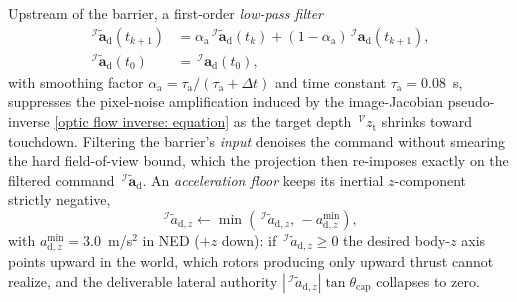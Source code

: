 \documentclass{IEEEtaes}
\begin{document}
Upstream of the barrier, a first-order \emph{low-pass filter}
\begin{align} \label{lpf: equation}
    \,^\mathcal{I}\!\tilde{\boldsymbol{a}}_\text{d}(t_{k+1}) &= \alpha_\text{a}\,^\mathcal{I}\!\tilde{\boldsymbol{a}}_\text{d}(t_k)+(1-\alpha_\text{a})\,^\mathcal{I}\!\boldsymbol{a}_\text{d}(t_{k+1}), \nonumber\\
    \,^\mathcal{I}\!\tilde{\boldsymbol{a}}_\text{d}(t_0) &= \,^\mathcal{I}\!\boldsymbol{a}_\text{d}(t_0),
\end{align}
with smoothing factor $\alpha_\text{a}=\tau_\text{a}/(\tau_\text{a}+\Delta t)$ and time constant $\tau_\text{a}=0.08$~s, suppresses the pixel-noise amplification induced by the image-Jacobian pseudo-inverse \eqref{optic flow inverse: equation} as the target depth $\,^\mathcal{V}z_\text{t}$ shrinks toward touchdown. Filtering the barrier's \emph{input} denoises the command without smearing the hard field-of-view bound, which the projection then re-imposes exactly on the filtered command $\,^\mathcal{I}\tilde{\boldsymbol{a}}_\text{d}$. An \emph{acceleration floor} keeps its inertial $z$-component strictly negative,
\begin{equation} \label{acceleration floor: equation}
    \,^\mathcal{I}\tilde{a}_{\text{d},z}\leftarrow \min(\,^\mathcal{I}\tilde{a}_{\text{d},z},\,-a_{\text{d},z}^{\min}),
\end{equation}
with $a_{\text{d},z}^{\min}=3.0$~m/s$^2$ in NED ($+z$ down): if $\,^\mathcal{I}\tilde{a}_{\text{d},z}\ge 0$ the desired body-$z$ axis points upward in the world, which rotors producing only upward thrust cannot realize, and the deliverable lateral authority $|\,^\mathcal{I}\tilde{a}_{\text{d},z}|\tan\theta_\text{cap}$ collapses to zero.
\end{document}
